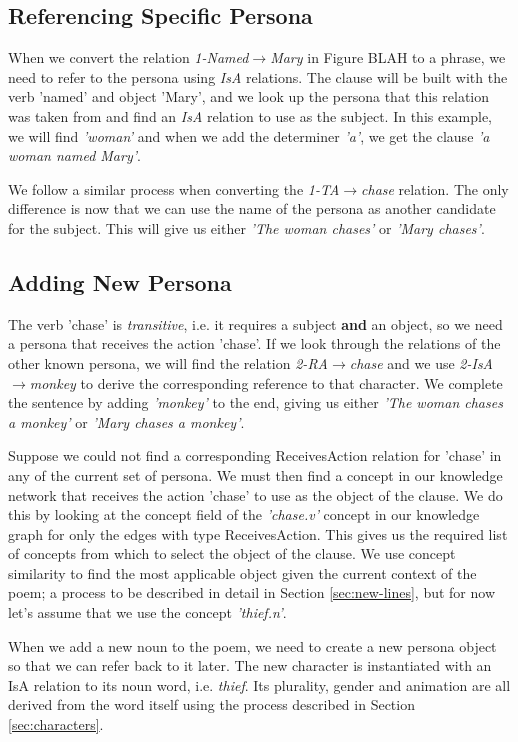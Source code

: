 \subsection{Referencing Specific Persona}
When we convert the relation \textit{1-Named$\rightarrow$Mary} in Figure BLAH to a phrase, we need to refer to the persona using \textit{IsA} relations. The clause will be built with the verb 'named' and object 'Mary', and we look up the persona that this relation was taken from and find an \textit{IsA} relation to use as the subject. In this example, we will find \textit{'woman'} and when we add the determiner \textit{'a'}, we get the clause \textit{'a woman named Mary'}.

We follow a similar process when converting the \textit{1-TA$\rightarrow$chase} relation. The only difference is now that we can use the name of the persona as another candidate for the subject. This will give us either \textit{'The woman chases'} or \textit{'Mary chases'}.

\subsection{Adding New Persona}
The verb 'chase' is \textit{transitive}, i.e. it requires a subject \textbf{and} an object, so we need a persona that receives the action 'chase'. If we look through the relations of the other known persona, we will find the relation \textit{2-RA$\rightarrow$chase} and we use \textit{2-IsA$\rightarrow$monkey} to derive the corresponding reference to that character. We complete the sentence by adding \textit{'monkey'} to the end, giving us either \textit{'The woman chases a monkey'} or \textit{'Mary chases a monkey'}.

Suppose we could not find a corresponding ReceivesAction relation for 'chase' in any of the current set of persona. We must then find a concept in our knowledge network that receives the action 'chase' to use as the object of the clause. We do this by looking at the concept field of the \textit{'chase.v'} concept in our knowledge graph for only the edges with type ReceivesAction. This gives us the required list of concepts from which to select the object of the clause. We use concept similarity to find the most applicable object given the current context of the poem; a process to be described in detail in Section \ref{sec:new-lines}, but for now let's assume that we use the concept \textit{'thief.n'}.

When we add a new noun to the poem, we need to create a new persona object so that we can refer back to it later. The new character is instantiated with an IsA relation to its noun word, i.e. \textit{thief}. Its plurality, gender and animation are all derived from the word itself using the process described in Section \ref{sec:characters}.


